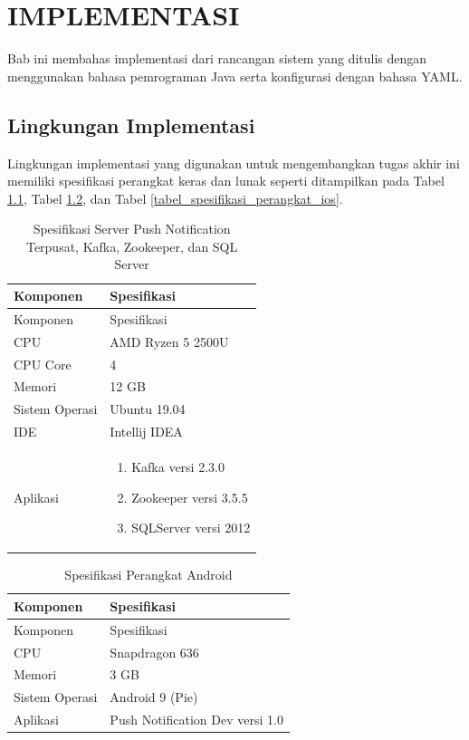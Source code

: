 \chapter {IMPLEMENTASI}
\par Bab ini membahas implementasi dari rancangan sistem yang ditulis dengan menggunakan bahasa pemrograman Java serta konfigurasi dengan bahasa YAML.

\section{Lingkungan Implementasi}
\par Lingkungan implementasi yang digunakan untuk mengembangkan tugas akhir ini memiliki spesifikasi perangkat keras dan lunak seperti ditampilkan pada Tabel \ref{tabel_spesifikasi_server}, Tabel \ref{tabel_spesifikasi_perangkat_android}, dan Tabel \ref{tabel_spesifikasi_perangkat_ios}.
\begin{longtable}{|p{3cm}|p{6.5cm}|}
	\caption{Spesifikasi Server Push Notification Terpusat, Kafka, Zookeeper, dan SQL Server} \label{tabel_spesifikasi_server} \\ \hline
	\rowcolor{lightgray} Komponen & Spesifikasi \\ \hline
	\endfirsthead
	\hline
	\rowcolor{lightgray} Komponen & Spesifikasi \\ \hline
	\endhead
	CPU & AMD Ryzen 5 2500U \\ \hline
	CPU Core & 4 \\ \hline
	Memori & 12 GB \\ \hline
	Sistem Operasi & Ubuntu 19.04 \\ \hline
	IDE & Intellij IDEA \\ \hline
	Aplikasi & \begin{enumerate}
		\item Kafka versi 2.3.0
		\item Zookeeper versi 3.5.5
		\item SQLServer versi 2012
	\end{enumerate} \\ \hline
\end{longtable}
\begin{longtable}{|p{3cm}|p{6.5cm}|}
	\caption{Spesifikasi Perangkat Android} \label{tabel_spesifikasi_perangkat_android} \\ \hline
	\rowcolor{lightgray} Komponen & Spesifikasi \\ \hline
	\endfirsthead
	\hline
	\rowcolor{lightgray} Komponen & Spesifikasi \\ \hline
	\endhead
	CPU & Snapdragon 636 \\ \hline
	Memori & 3 GB \\ \hline
	Sistem Operasi & Android 9 (Pie) \\ \hline
	Aplikasi & Push Notification Dev versi 1.0 \\ \hline
\end{longtable}
